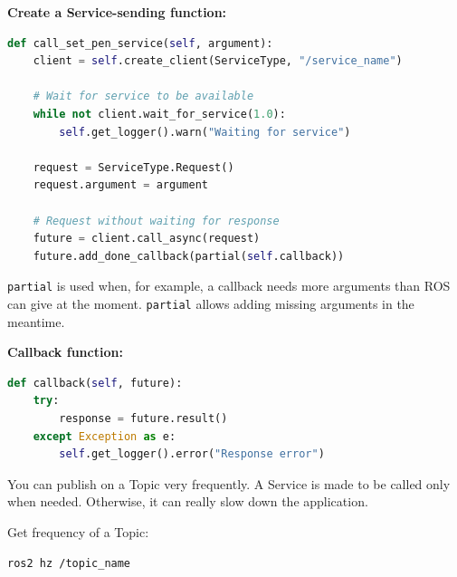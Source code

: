 \documentclass{article}
\newcommand{\code}[1]{\colorbox{codeBg}{\texttt{#1}}}
\begin{document}
\vspace{0.3cm}
\noindent \textbf{Create a Service-sending function:}
\begin{lstlisting}[style=pythonStyle, language=Python]
def call_set_pen_service(self, argument):
    client = self.create_client(ServiceType, "/service_name")
    
    # Wait for service to be available
    while not client.wait_for_service(1.0):
        self.get_logger().warn("Waiting for service")
        
    request = ServiceType.Request()
    request.argument = argument
    
    # Request without waiting for response
    future = client.call_async(request)
    future.add_done_callback(partial(self.callback))
\end{lstlisting}

\vspace{0.3cm}
\begin{notebox}
\code{partial} is used when, for example, a callback needs more arguments than ROS can give at the moment. \code{partial} allows adding missing arguments in the meantime.
\end{notebox}

\vspace{0.3cm}
\noindent \textbf{Callback function:}
\begin{lstlisting}[style=pythonStyle, language=Python]
def callback(self, future):
    try:
        response = future.result()
    except Exception as e:
        self.get_logger().error("Response error")
\end{lstlisting}

\vspace{0.3cm}
\begin{warnbox}
You can publish on a Topic very frequently. A Service is made to be called only when needed. Otherwise, it can really slow down the application.
\end{warnbox}

\vspace{0.3cm}
\noindent Get frequency of a Topic:
\begin{lstlisting}[style=bashStyle, language=bash]
ros2 hz /topic_name
\end{lstlisting}
\end{document}
